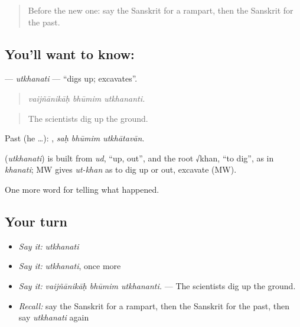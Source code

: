 \label{lesson:SA-C323-utkhanati}



\begin{quote}
Before the new one: say the Sanskrit for a rampart, then the Sanskrit for the past.
\end{quote}

\subsection*{You'll want to know: }
\textbf{} — \emph{utkhanati} — \textquotedblleft{}digs up; excavates\textquotedblright{}.

\begin{quote}
  
\end{quote}

\begin{quote}
\emph{vaijñānikāḥ bhūmim utkhananti.}
\end{quote}

\begin{quote}
The scientists dig up the ground.
\end{quote}

Past (he …):   , \emph{saḥ bhūmim utkhātavān}.

\begin{cousinweb}
\textbf{} (\emph{utkhanati}) is built from \emph{ud}, \textquotedblleft{}up, out\textquotedblright{}, and the root √khan, \textquotedblleft{}to dig\textquotedblright{}, as in \emph{khanati}; MW gives \emph{ut-khan} as to dig up or out, excavate (MW).
\end{cousinweb}

\begin{grammarlens}[title={What you've built}]
One more word for telling what happened.
\end{grammarlens}

\subsection*{Your turn}
\begin{itemize}
\raggedright
  \item \emph{Say it:} \emph{utkhanati}
  \item \emph{Say it:} \emph{utkhanati}, once more
  \item \emph{Say it:} \emph{vaijñānikāḥ bhūmim utkhananti.} — The scientists dig up the ground.
  \item \emph{Recall:} say the Sanskrit for a rampart, then the Sanskrit for the past, then say \emph{utkhanati} again
\end{itemize}


